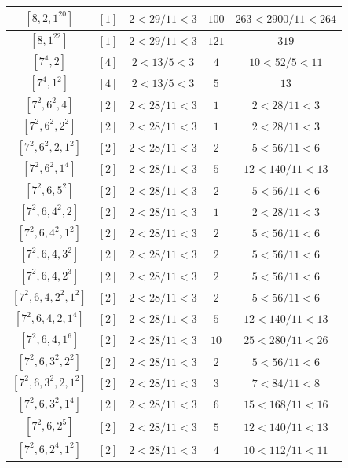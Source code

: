 \documentclass{article}%
\begin{document}
\begin{center}
\begin{longtable}{||c|c|c|c|c||}
$[8, 2, 1^{20}]$ & $[1]$ & $2 < 29/11 < 3$ & $100$ & $263 < 2900/11 < 264$ \\ \hline 
$[8, 1^{22}]$ & $[1]$ & $2 < 29/11 < 3$ & $121$ & $319$ \\ \hline 
$[7^{4}, 2]$ & $[4]$ & $2 < 13/5 < 3$ & $4$ & $10 < 52/5 < 11$ \\ \hline 
$[7^{4}, 1^{2}]$ & $[4]$ & $2 < 13/5 < 3$ & $5$ & $13$ \\ \hline 
$[7^{2}, 6^{2}, 4]$ & $[2]$ & $2 < 28/11 < 3$ & $1$ & $2 < 28/11 < 3$ \\ \hline 
$[7^{2}, 6^{2}, 2^{2}]$ & $[2]$ & $2 < 28/11 < 3$ & $1$ & $2 < 28/11 < 3$ \\ \hline 
$[7^{2}, 6^{2}, 2, 1^{2}]$ & $[2]$ & $2 < 28/11 < 3$ & $2$ & $5 < 56/11 < 6$ \\ \hline 
$[7^{2}, 6^{2}, 1^{4}]$ & $[2]$ & $2 < 28/11 < 3$ & $5$ & $12 < 140/11 < 13$ \\ \hline 
$[7^{2}, 6, 5^{2}]$ & $[2]$ & $2 < 28/11 < 3$ & $2$ & $5 < 56/11 < 6$ \\ \hline 
$[7^{2}, 6, 4^{2}, 2]$ & $[2]$ & $2 < 28/11 < 3$ & $1$ & $2 < 28/11 < 3$ \\ \hline 
$[7^{2}, 6, 4^{2}, 1^{2}]$ & $[2]$ & $2 < 28/11 < 3$ & $2$ & $5 < 56/11 < 6$ \\ \hline 
$[7^{2}, 6, 4, 3^{2}]$ & $[2]$ & $2 < 28/11 < 3$ & $2$ & $5 < 56/11 < 6$ \\ \hline 
$[7^{2}, 6, 4, 2^{3}]$ & $[2]$ & $2 < 28/11 < 3$ & $2$ & $5 < 56/11 < 6$ \\ \hline 
$[7^{2}, 6, 4, 2^{2}, 1^{2}]$ & $[2]$ & $2 < 28/11 < 3$ & $2$ & $5 < 56/11 < 6$ \\ \hline 
$[7^{2}, 6, 4, 2, 1^{4}]$ & $[2]$ & $2 < 28/11 < 3$ & $5$ & $12 < 140/11 < 13$ \\ \hline 
$[7^{2}, 6, 4, 1^{6}]$ & $[2]$ & $2 < 28/11 < 3$ & $10$ & $25 < 280/11 < 26$ \\ \hline 
$[7^{2}, 6, 3^{2}, 2^{2}]$ & $[2]$ & $2 < 28/11 < 3$ & $2$ & $5 < 56/11 < 6$ \\ \hline 
$[7^{2}, 6, 3^{2}, 2, 1^{2}]$ & $[2]$ & $2 < 28/11 < 3$ & $3$ & $7 < 84/11 < 8$ \\ \hline 
$[7^{2}, 6, 3^{2}, 1^{4}]$ & $[2]$ & $2 < 28/11 < 3$ & $6$ & $15 < 168/11 < 16$ \\ \hline 
$[7^{2}, 6, 2^{5}]$ & $[2]$ & $2 < 28/11 < 3$ & $5$ & $12 < 140/11 < 13$ \\ \hline 
$[7^{2}, 6, 2^{4}, 1^{2}]$ & $[2]$ & $2 < 28/11 < 3$ & $4$ & $10 < 112/11 < 11$ \\ \hline 

\end{longtable}
\end{center}
\end{document}
